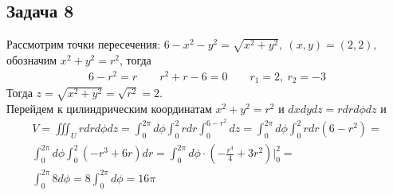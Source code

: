 \subsection*{Задача 8}
	Рассмотрим точки пересечения: $6 - x^2 - y^2 = \sqrt{x^2 + y^2},\ (x,y) = (2,2)$, обозначим $x^2 + y^2 = r^2$, тогда
	\begin{gather*}
		6 - r^2 = r\qquad r^2 + r - 6 = 0\qquad r_1 = 2,\ r_2 = -3
	\end{gather*}
	Тогда $z = \sqrt{x^2 + y^2} = \sqrt{r^2} = 2$.\\
	Перейдем к цилиндрическим координатам $x^2 + y^2 = r^2$ и $dxdydz = rdrd\phi dz$ и
	\begin{gather*}
		V = \iiint_U rdrd\phi dz = \int_{0}^{2\pi} d\phi \int_{0}^{2} rdr \int_{0}^{6 - r^2} dz = 
		\int_{0}^{2\pi} d\phi \int_{0}^{2} rdr (6 - r^2) =\\
		\int_{0}^{2\pi} d\phi \int_{0}^{2} (-r^3 + 6r) dr =
		\int_{0}^{2\pi} d\phi \cdot \left(-\frac{r^4}{4} + 3r^2\right)\bigg|_{0}^{2} =\\
		\int_{0}^{2\pi} 8 d\phi = 
		8 \int_{0}^{2\pi} d\phi =
		16\pi
	\end{gather*}
\vskip 0.4in


